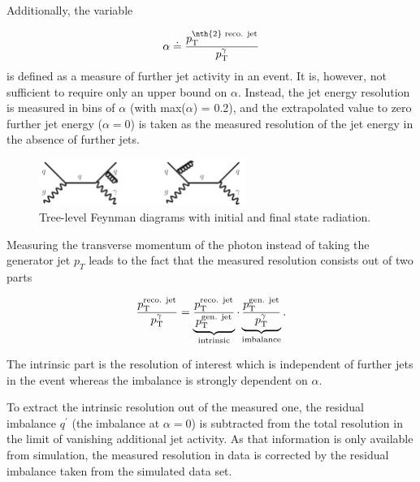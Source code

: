 Additionally, the variable 

\begin{equation}\label{eq:alphaDef}
\alpha \doteq \frac{\pt^{\text{\nth{2} reco. jet}}}{\pt^{\gamma}}
\end{equation} 
is defined as a measure of further jet activity in an event. 
It is, however, not sufficient to require only an upper bound on $\alpha$. 
Instead, the jet energy resolution is measured in bins of $\alpha$ (with max($\alpha$) = 0.2), 
and the \mbox{extrapolated} value to zero further jet energy ($\alpha=0$) is taken as the measured resolution of the jet energy in the absence of further jets.


\begin{figure}[t]
  \centering

      \includegraphics[width=0.60\textwidth]{figures/resolution/generalApproach/FeynmanDiagramsWithRadiation.pdf}
  
  \caption{Tree-level Feynman diagrams with initial and final state radiation.}  
  \label{fig:FeynmanDiagramsWithRadiation}
\end{figure}

Measuring the transverse momentum of the photon instead of taking the generator jet $p_{T}$ leads to the fact that the measured resolution consists out of two parts

\begin{equation}\label{eq:splitting}
\frac{p_{\text{T}}^{\text{reco. jet}}}{p_{\text{T}}^{\gamma}} = \underbrace{\frac{p_{\text{T}}^{\text{reco. jet}}}{p_{\text{T}}^{\text{gen. jet}}}}_{\text{intrinsic}} \cdot \underbrace{\frac{p_{\text{T}}^{\text{gen. jet}}}{p_{\text{T}}^{\gamma}}}_{\text{imbalance}}.
\end{equation}

The intrinsic part is the resolution of interest which is independent of further jets in the event whereas the imbalance is strongly dependent on $\alpha$.

To extract the intrinsic resolution out of the measured one, the residual imbalance $q^{\prime}$ (the imbalance at $\alpha = 0$) is subtracted from the total resolution in the 
limit of vanishing additional jet activity. 
As that information is only available from simulation, the measured resolution in data is corrected by the residual imbalance taken from the simulated data set.

